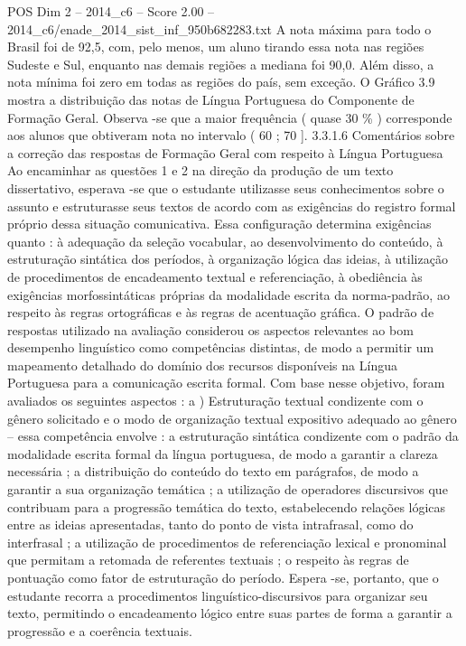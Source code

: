 \begin{textsample}{POS Dim 2 – 2014\_c6 – Score 2.00 – 2014\_c6/enade\_2014\_sist\_inf\_950b682283.txt}
A nota máxima para todo o Brasil foi de 92,5, com, pelo menos, um aluno tirando essa nota nas regiões Sudeste e Sul, enquanto nas demais regiões a mediana foi 90,0.
Além disso, a nota mínima foi zero em todas as regiões do país, sem exceção.
O Gráfico 3.9 mostra a distribuição das notas de Língua Portuguesa do Componente de Formação Geral.
Observa -se que a maior frequência ( quase 30 \% ) corresponde aos alunos que obtiveram nota no intervalo ( 60 ; 70 ]. 3.3.1.6 Comentários sobre a correção das respostas de Formação Geral com respeito à Língua Portuguesa Ao encaminhar as questões 1 e 2 na direção da produção de um texto dissertativo, esperava -se que o estudante utilizasse seus conhecimentos sobre o assunto e estruturasse seus textos de acordo com as exigências do registro formal próprio dessa situação comunicativa.
Essa configuração determina exigências quanto : à adequação da seleção vocabular, ao desenvolvimento do conteúdo, à estruturação sintática dos períodos, à organização lógica das ideias, à utilização de procedimentos de encadeamento textual e referenciação, à obediência às exigências morfossintáticas próprias da modalidade escrita da norma-padrão, ao respeito às regras ortográficas e às regras de acentuação gráfica.
O padrão de respostas utilizado na avaliação considerou os aspectos relevantes ao bom desempenho linguístico como competências distintas, de modo a permitir um mapeamento detalhado do domínio dos recursos disponíveis na Língua Portuguesa para a comunicação escrita formal.
Com base nesse objetivo, foram avaliados os seguintes aspectos : a ) Estruturação textual condizente com o gênero solicitado e o modo de organização textual expositivo adequado ao gênero – essa competência envolve : a estruturação sintática condizente com o padrão da modalidade escrita formal da língua portuguesa, de modo a garantir a clareza necessária ; a distribuição do conteúdo do texto em parágrafos, de modo a garantir a sua organização temática ; a utilização de operadores discursivos que contribuam para a progressão temática do texto, estabelecendo relações lógicas entre as ideias apresentadas, tanto do ponto de vista intrafrasal, como do interfrasal ; a utilização de procedimentos de referenciação lexical e pronominal que permitam a retomada de referentes textuais ; o respeito às regras de pontuação como fator de estruturação do período.
Espera -se, portanto, que o estudante recorra a procedimentos linguístico-discursivos para organizar seu texto, permitindo o encadeamento lógico entre suas partes de forma a garantir a progressão e a coerência textuais.

\end{textsample}
